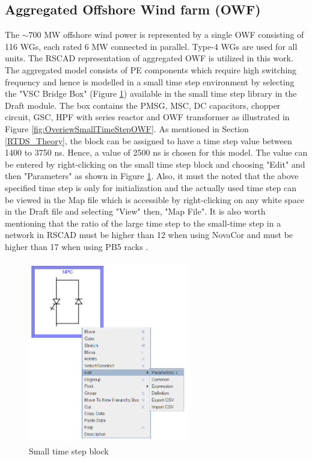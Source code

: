 \subsection{ Aggregated Offshore Wind farm (OWF)}\label{OWF}

The $\sim{700}$ MW offshore wind power is represented by a single \gls{OWF} consisting of 116 \gls{WG}s, each rated 6 MW connected in parallel. Type-4 \gls{WG}s are used for all units. The RSCAD representation of aggregated \gls{OWF} is utilized in this work. The aggregated model consists of \gls{PE} components which require high switching frequency %
and hence is modelled in a small time step environment by selecting the "VSC Bridge Box" (Figure \ref{fig:SmallTimeStepBlock}) available in the small time step library in the Draft module. The box contains the \gls{PMSG}, \gls{MSC}, \gls{DC} capacitors, chopper circuit, \gls{GSC}, \gls{HPF} with series reactor and \gls{OWF} transformer as illustrated in Figure \ref{fig:OveriewSmallTimeStepOWF}. As mentioned in Section \ref{RTDS_Theory}, the block can be assigned to have a time step value between 1400 to 3750 ns. Hence, a value of 2500 ns is chosen for this model. 
The value can be entered by right-clicking on the small time step block and choosing "Edit" and then "Parameters" as shown in Figure \ref{fig:SmallTimeStepBlock}. Also, it must the noted that the above specified time step is only for initialization and the actually used time step can be viewed in the Map file which is accessible by right-clicking on any white space in the Draft file and selecting "View" then, "Map File". It is also worth mentioning that the ratio of the large time step to the small-time step in a network in RSCAD must be higher than 12 when using NovaCor and must be higher than 17 when using PB5 racks \cite{rtds_tech}. 

\begin{figure}[H]
\centering
    \includegraphics[height = 8cm,width = 7cm]{Diagrams/Chapter_3/SmallTimeStepBlock.PNG}
    \caption{Small time step block}
    \label{fig:SmallTimeStepBlock}
\end{figure}

